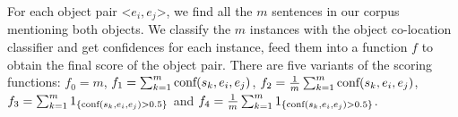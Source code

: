 For each object pair \textless$e_i,e_j$\textgreater, 
we find all the $m$ sentences in our corpus mentioning both objects.
We classify the $m$ instances with the object
co-location classifier and get confidences for each instance, 
feed them into a function $f$ to obtain the final score 
of the object pair. 
There are five variants of the scoring functions:
$f_0=m$, $f_1=\sum_{k=1}^{m}\textnormal{conf}(s_k,e_i,e_j)$, $f_2=\frac{1}{m}\sum_{k=1}^{m}\textnormal{conf}(s_k,e_i,e_j)$, $f_3=\sum_{k=1}^{m}
1_{\{\textnormal{conf}(s_k,e_i,e_j)>0.5\}}$ and $	f_4=\frac{1}{m}\sum_{k=1}^{m} 
1_{ \{ \textnormal{conf}(s_k,e_i,e_j)>0.5 \} }$.




